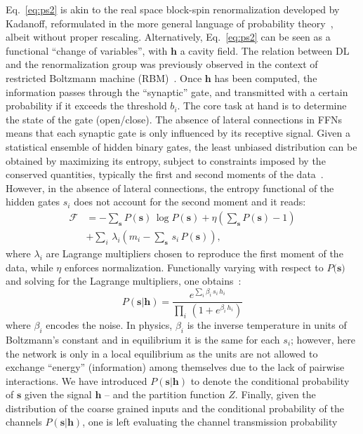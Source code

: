 \documentclass{article}
\begin{document}
%
Eq.~\eqref{eq:ps2} is akin to the real space block-spin renormalization developed by Kadanoff, reformulated in the more general language of probability theory~\cite{roberto, ma, cassandro}, albeit without proper rescaling. Alternatively, Eq.~\eqref{eq:ps2} can be seen as a functional ``change of variables'', with $\mathbf{h}$ a cavity field. The relation between DL and the renormalization group was previously observed in the context of restricted Boltzmann machine (RBM)~\cite{mehta}. Once $\mathbf{h}$ has been computed, the information passes through the ``synaptic'' gate, and transmitted with a certain probability if it exceeds the threshold $b_i$. The core task at hand is to determine the state of the gate (open/close). The absence of lateral connections in FFNs means that each synaptic gate is only influenced by its receptive signal. Given a statistical ensemble of hidden binary gates, the least unbiased distribution  can be obtained by maximizing its entropy, subject to constraints imposed by the conserved quantities, typically the first and second moments of the data~\cite{zecchina, mckay}. However, in the absence of lateral connections, the entropy functional of the hidden gates $s_i$ does not account for the second moment and it reads:
%
\begin{align} \label{eq:entropy2}
\mathscr{F} &= - \sum_{\mathbf{s}} P(\mathbf{s}) \, \log P(\mathbf{s}) + \eta \left( \sum_{\mathbf{s}} P(\mathbf{s}) -1\right) \\ \nonumber
&+ \sum_i \, \lambda_i \left( m_i -  \sum_{\mathbf{s}} \, s_i \, P(\mathbf{s}) \right),
 \end{align}
where $\lambda_i$ are Lagrange multipliers chosen to reproduce the first moment of the data,  while $\eta$ enforces normalization. Functionally varying with respect to $P(\mathbf{s)}$ and solving for the Lagrange multipliers, one  obtains~\cite{roberto}:
%
\begin{equation} \label{eq:entropy4}
P(\mathbf{s} | \mathbf{h}) = \frac{e^{ \sum_i \beta_i  \, s_i \, h_i }}{\prod_i \, \left( 1+ e^{\beta_i \, h_i} \right)}
\end{equation}
%
where $\beta_i$ encodes the noise.  In physics, $\beta_i$ is the inverse temperature in units of Boltzmann's constant and in equilibrium it is the same for each $s_i$; however, here the network is only in a local equilibrium as the units are not allowed to exchange ``energy'' (information) among themselves due to the lack of pairwise interactions. We have introduced $P(\mathbf{s} | \mathbf{h})$ to denote the conditional probability of $\mathbf{s}$ given the signal $\mathbf{h}$ --  and the partition function $Z$. Finally, given the distribution of the coarse grained inputs and the conditional probability of the channels $P(\mathbf{s}|\mathbf{h})$, one is left evaluating the channel transmission probability
\end{document}
